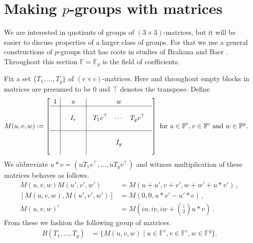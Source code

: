 \documentclass{toc}
\numberwithin{equation}{section}
\theoremstyle{plain}       %
\theoremstyle{remark}
\theoremstyle{definition}
\numberwithin{figure}{section}
\numberwithin{table}{section}
\newcommand{\bbF}{\mathbb{F}}  %
\begin{document}
%
\section{Making \texorpdfstring{$p$}{p}-groups with matrices}\label{sec:making}
We are interested in quotients of groups of $(3\times 3)$-matrices, but it will
be easier to discuss properties of a larger class of groups.  For that we use a
general constructions of $p$-groups that has roots in studies of Brahana and
Baer \cite{Brahana, Baer}.
%
Throughout this section $\bbF=\bbF_p$ is the field of coefficients.

Fix a set $\{T_1,\dots,T_g\}$ of $(r\times c)$-matrices.  Here and throughout
empty blocks in matrices are presumed to be $0$ and $\top$ denotes the
transpose.  Define
\begin{align}\label{def:M}
	M(u,v,w) & :=
	\left[\begin{array}{c|ccc|c}
		1 & & u & & w \\
		\hline
		  & & & & \\	 
		  & & I_r & & 
		   \begin{array}{ccc} T_1v^\top & \cdots & T_g v^\top\end{array} \\
		  & & & &  \\
		 \hline
		  & & & & \\
		  & & & & I_g\\
		  & & & & 
		\end{array}\right]\textnormal{ for } u\in \bbF^r, v\in \bbF^c \textnormal{ and } w\in \bbF^g.
\end{align}
We abbreviate $u*v=(uT_1v^{\top},\ldots,uT_g v^{\top})$ and witness 
multiplication of these matrices behaves as follows.
\begin{align*}
	M(u,v,w)M(u',v',w') & = M(u+u',v+v',
	w+w'+u*v')\,,\\
	[M(u,v,w),M(u',v',w')] & = M(0,0,u*v'-u'*v)\,,\\
	M(u,v,w)^i & = M\left(iu,iv, iw+\binom{i}{2}u *v\right)\,.
\end{align*}
{}From these we fashion the following group of matrices.
\begin{align}\label{eq:Brahana}
	B(T_1,\dots,T_g) & =
		\{ 	M(u,v,w) \mid 
			u\in \bbF^r,	v\in\bbF^c, 
			w\in\bbF^g
	\}.
\end{align}
\end{document}
